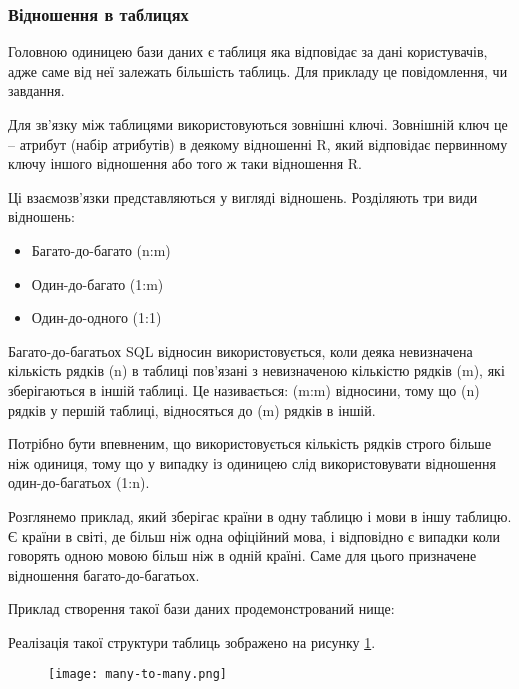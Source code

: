 \subsubsection{Відношення в таблицях}
\par Головною одиницею бази даних є таблиця яка відповідає за дані користувачів, адже саме від неї залежать більшість таблиць. Для прикладу це повідомлення, чи завдання.
\par Для зв'язку між таблицями використовуються зовнішні ключі. Зовнішній ключ це -- атрибут (набір атрибутів) в деякому відношенні R, який відповідає первинному ключу іншого відношення або того ж таки відношення R.
\par Ці взаємозв'язки представляються у вигляді відношень. Розділяють три види відношень:
\begin{itemize}
	\item Багато-до-багато (n:m)
	\item Один-до-багато (1:m)
	\item Один-до-одного (1:1)
\end{itemize}
\par Багато-до-багатьох SQL відносин використовується, коли деяка невизначена кількість рядків (n) в таблиці пов'язані з невизначеною кількістю рядків (m), які зберігаються в іншій таблиці. Це називається: (m:m) відносини, тому що (n) рядків у першій таблиці, відносяться до (m) рядків в іншій.
\par Потрібно бути впевненим, що використовується кількість рядків строго більше ніж одиниця, тому що у випадку із одиницею слід використовувати відношення один-до-багатьох (1:n).
\par Розглянемо приклад, який зберігає країни в одну таблицю і мови в іншу таблицю. Є країни в світі, де більш ніж одна офіційний мова, і відповідно є випадки коли говорять одною мовою більш ніж в одній країні. Саме для цього призначене відношення багато-до-багатьох. 
\par Приклад створення такої бази даних продемонстрований нище:


\par Реалізація такої структури таблиць зображено на рисунку \ref{pic:many_to_many.png}.
\begin{figure}[!ht]
\centering
		\texttt{[image: many-to-many.png]}
		\label{pic:many_to_many.png}
\end{figure}

